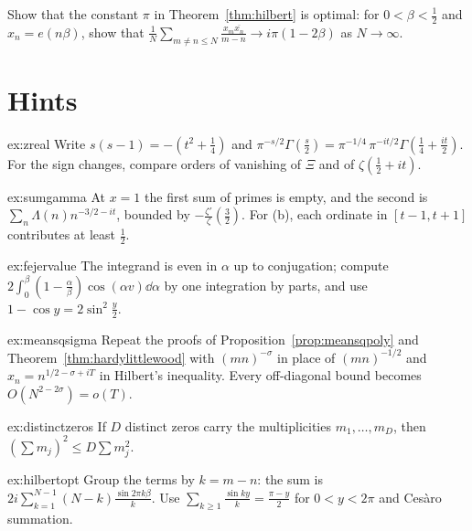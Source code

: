 \begin{exercise}[$\star\star\star$]\label{ex:hilbertopt}
Show that the constant $\pi$ in Theorem~\ref{thm:hilbert} is optimal: for $0<\beta<\frac12$ and $x_n=e(n\beta)$, show that $\frac1N\sum_{m\ne n\le N}\frac{x_m\overline{x_n}}{m-n}\to i\pi(1-2\beta)$ as $N\to\infty$.
\end{exercise}

\section{Hints}

\begin{hint}{ex:zreal}
Write $s(s-1)=-(t^2+\frac14)$ and $\pi^{-s/2}\Gamma(\frac s2)=\pi^{-1/4}\,\pi^{-it/2}\Gamma(\frac14+\frac{it}2)$. For the sign changes, compare orders of vanishing of $\Xi$ and of $\zeta(\frac12+it)$.
\end{hint}

\begin{hint}{ex:sumgamma}
At $x=1$ the first sum of primes is empty, and the second is $\sum_n\Lambda(n)n^{-3/2-it}$, bounded by $-\frac{\zeta'}\zeta(\frac32)$. For (b), each ordinate in $[t-1,t+1]$ contributes at least $\frac12$.
\end{hint}

\begin{hint}{ex:fejervalue}
The integrand is even in $\alpha$ up to conjugation; compute $2\int_0^\beta(1-\frac\alpha\beta)\cos(\alpha v)\dd\alpha$ by one integration by parts, and use $1-\cos y=2\sin^2\frac y2$.
\end{hint}

\begin{hint}{ex:meansqsigma}
Repeat the proofs of Proposition~\ref{prop:meansqpoly} and Theorem~\ref{thm:hardylittlewood} with $(mn)^{-\sigma}$ in place of $(mn)^{-1/2}$ and $x_n=n^{1/2-\sigma+iT}$ in Hilbert's inequality. Every off-diagonal bound becomes $O(N^{2-2\sigma})=o(T)$.
\end{hint}

\begin{hint}{ex:distinctzeros}
If $D$ distinct zeros carry the multiplicities $m_1,\dots,m_D$, then $(\sum m_j)^2\le D\sum m_j^2$.
\end{hint}

\begin{hint}{ex:hilbertopt}
Group the terms by $k=m-n$: the sum is $2i\sum_{k=1}^{N-1}(N-k)\frac{\sin2\pi k\beta}k$. Use $\sum_{k\ge1}\frac{\sin ky}k=\frac{\pi-y}2$ for $0<y<2\pi$ and Cesàro summation.
\end{hint}

